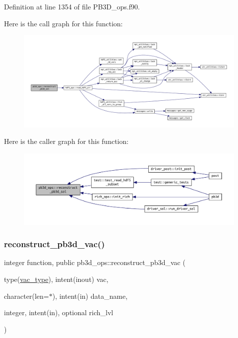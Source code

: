 Definition at line 1354 of file P\+B3\+D\+\_\+ops.\+f90.

Here is the call graph for this function\+:\nopagebreak
\begin{figure}[H]
\begin{center}
\leavevmode
\includegraphics[width=350pt]{namespacepb3d__ops_ae7afc544227f34f2877eb5a14d620823_cgraph}
\end{center}
\end{figure}
Here is the caller graph for this function\+:\nopagebreak
\begin{figure}[H]
\begin{center}
\leavevmode
\includegraphics[width=350pt]{namespacepb3d__ops_ae7afc544227f34f2877eb5a14d620823_icgraph}
\end{center}
\end{figure}
\mbox{\label{namespacepb3d__ops_a281c496a42c4ea46606e929e10d51582}} 
\subsubsection{\texorpdfstring{reconstruct\+\_\+pb3d\+\_\+vac()}{reconstruct\_pb3d\_vac()}}
{\footnotesize\ttfamily integer function, public pb3d\+\_\+ops\+::reconstruct\+\_\+pb3d\+\_\+vac (\begin{DoxyParamCaption}\item[{type(\hyperlink{structvac__vars_1_1vac__type}{vac\+\_\+type}), intent(inout)}]{vac,  }\item[{character(len=$\ast$), intent(in)}]{data\+\_\+name,  }\item[{integer, intent(in), optional}]{rich\+\_\+lvl }\end{DoxyParamCaption})}



